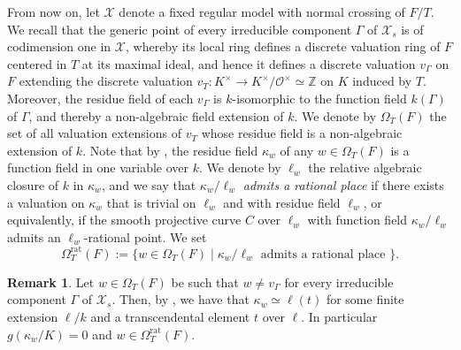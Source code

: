 \documentclass[a4paper,12pt,reqno]{amsart}
\newcommand\mc\mathcal
\theoremstyle{definition}
\newtheorem{rem}[thm]{Remark}
\numberwithin{equation}{thm}
\begin{document}
From now on, let $\mathcal{X}$ denote a fixed regular model with normal crossing of $F/T$. We recall that the generic point of every irreducible component $\Gamma$ of $\mc{X}_s$ is of codimension one in $\mc{X}$, whereby its local ring defines a discrete valuation ring of $F$ centered in $T$ at its maximal ideal, and hence it defines a discrete valuation $v_{\Gamma}$ on $F$ extending 
the discrete valuation $v_T: K^\times \to K^\times/\mathcal{O}^\times \simeq \mathbb{Z}$ on $K$ induced by $T$. Moreover, the residue field of each $v_\Gamma$ is $k$-isomorphic to the function field $k(\Gamma)$ of $\Gamma$, and thereby a non-algebraic field extension of $k$.  We denote by $\Omega_T(F)$ the set of all valuation extensions of $v_T$ whose residue field is a non-algebraic extension of $k$. 
Note that by \cite[Proposition 3.1]{BGVG14}, the residue field $\kappa_w$ of any $w \in \Omega_T(F)$ is a function field in one variable over $k$. We denote by $\ell_w$ the relative algebraic closure of $k$ in $\kappa_w$, and we say that $\kappa_w/\ell_w$ \textit{admits a rational place} if there exists a valuation on $\kappa_w$ that is trivial on $\ell_w$ and with residue field $\ell_w$, or equivalently, if the smooth projective curve $C$ over $\ell_w$ with function field $\kappa_w/\ell_w$ admits an $\ell_w$-rational point. 
We set $$\Omega^{\mathrm{rat}}_T(F):=\{w \in \Omega_T(F) \mid \kappa_w/\ell_w \text{ admits a rational place }\}.$$
\begin{rem}\label{algebrorational}
Let $w \in \Omega_T(F)$ be such that $w\neq v_\Gamma$ for every irreducible component $\Gamma$ of $\mc{X}_s$. Then, by \cite[Proposition 3.7]{BGVG14}, we have that
$\kappa_w \simeq \ell(t)$ for some finite extension $\ell/k$ and a transcendental element $t$ over $\ell$. In particular $g(\kappa_w/K)=0$ and $w \in  \Omega^{\text{rat}}_T(F)$.
\end{rem} 
\end{document}
